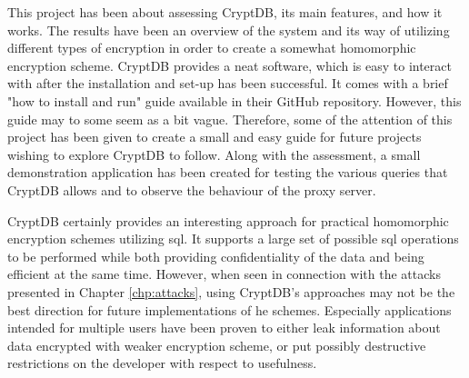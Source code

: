 This project has been about assessing CryptDB, its main features, and how it works. The results have been an overview of the system and its way of utilizing different types of encryption in order to create a somewhat homomorphic encryption scheme. CryptDB provides a neat software, which is easy to interact with after the installation and set-up has been successful. It comes with a brief "how to install and run" guide available in their GitHub repository. However, this guide may to some seem as a bit vague. Therefore, some of the attention of this project has been given to create a small and easy guide for future projects wishing to explore CryptDB to follow. Along with the assessment, a small demonstration application has been created for testing the various queries that CryptDB allows and to observe the behaviour of the proxy server.


CryptDB certainly provides an interesting approach for practical homomorphic encryption schemes utilizing \gls{sql}. It supports a large set of possible \gls{sql} operations to be performed while both providing confidentiality of the data and being efficient at the same time. However, when seen in connection with the attacks presented in Chapter \ref{chp:attacks}, using CryptDB's approaches may not be the best direction for future implementations of \gls{he} schemes. Especially applications intended for multiple users have been proven to either leak information about data encrypted with weaker encryption scheme, or put possibly destructive restrictions on the developer with respect to usefulness. 


